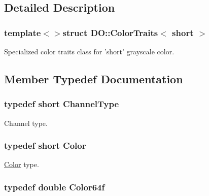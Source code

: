 \subsection{Detailed Description}
\subsubsection*{template$<$$>$struct D\-O\-::\-Color\-Traits$<$ short $>$}

Specialized color traits class for 'short' grayscale color. 

\subsection{Member Typedef Documentation}
\hypertarget{struct_d_o_1_1_color_traits_3_01short_01_4_a28c32afba2b462baca0f47d477ccf9e2}{
\subsubsection[{Channel\-Type}]{\setlength{\rightskip}{0pt plus 5cm}typedef short {\bf Channel\-Type}}}\label{struct_d_o_1_1_color_traits_3_01short_01_4_a28c32afba2b462baca0f47d477ccf9e2}
Channel type. \hypertarget{struct_d_o_1_1_color_traits_3_01short_01_4_a8dd4714eb3b4cc636650b4efa78c8319}{
\subsubsection[{Color}]{\setlength{\rightskip}{0pt plus 5cm}typedef short {\bf Color}}}\label{struct_d_o_1_1_color_traits_3_01short_01_4_a8dd4714eb3b4cc636650b4efa78c8319}
\hyperlink{class_d_o_1_1_color}{Color} type. \hypertarget{struct_d_o_1_1_color_traits_3_01short_01_4_a9a301fd8ba0a7225e38351d3e5b2e4d3}{
\subsubsection[{Color64f}]{\setlength{\rightskip}{0pt plus 5cm}typedef double {\bf Color64f}}}\label{struct_d_o_1_1_color_traits_3_01short_01_4_a9a301fd8ba0a7225e38351d3e5b2e4d3}
